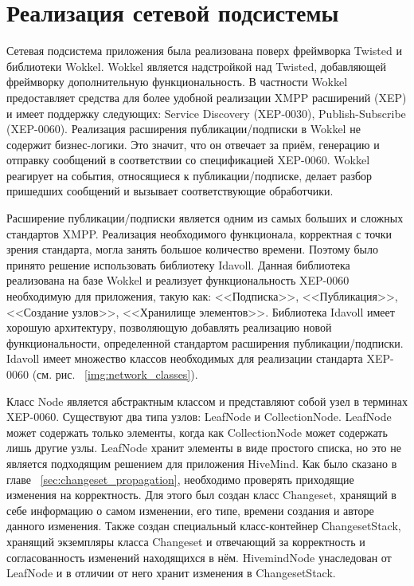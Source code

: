 \section{Реализация сетевой подсистемы}
Сетевая подсистема приложения была реализована поверх фреймворка Twisted и
библиотеки Wokkel. Wokkel является надстройкой над Twisted, добавляющей
фреймворку дополнительную функциональность. В частности Wokkel предоставляет
средства для более удобной реализации XMPP расширений (XEP) и имеет поддержку
следующих: Service Discovery (XEP-0030), Publish-Subscribe (XEP-0060).
Реализация расширения публикации/подписки в Wokkel не содержит бизнес-логики.
Это значит, что он отвечает за приём, генерацию и отправку сообщений в
соответствии со спецификацией XEP-0060. Wokkel реагирует на события, относящиеся
к публикации/подписке, делает разбор пришедших сообщений и вызывает
соответствующие обработчики.

Расширение публикации/подписки является одним из самых больших и сложных
стандартов XMPP. Реализация необходимого функционала, корректная с точки зрения
стандарта, могла занять большое количество времени. Поэтому было принято решение
использовать библиотеку Idavoll. Данная библиотека реализована на базе Wokkel и
реализует функциональность XEP-0060 необходимую для приложения, такую как:
<<Подписка>>, <<Публикация>>, <<Создание узлов>>, <<Хранилище элементов>>.
Библиотека Idavoll имеет хорошую архитектуру, позволяющую добавлять реализацию
новой функциональности, определенной стандартом расширения публикации/подписки.
Idavoll имеет множество классов необходимых для реализации стандарта XEP-0060
(см. рис. ~\ref{img:network_classes}).

Класс Node является абстрактным классом и представляют собой узел в терминах
XEP-0060. Существуют два типа узлов: LeafNode и CollectionNode. LeafNode может
содержать только элементы, когда как CollectionNode может содержать лишь другие
узлы. LeafNode хранит элементы в виде простого списка, но это не является
подходящим решением для приложения HiveMind. Как было сказано в главе
~\ref{sec:changeset_propagation}, необходимо проверять приходящие изменения на
корректность. Для этого был создан класс Changeset, хранящий в себе информацию о
самом изменении, его типе, времени создания и авторе данного изменения. Также
создан специальный класс-контейнер СhangesetStack, хранящий экземпляры класса
Changeset и отвечающий за корректность и согласованность изменений находящихся в
нём. HivemindNode унаследован от LeafNode и в отличии от него хранит изменения в
ChangesetStack.

